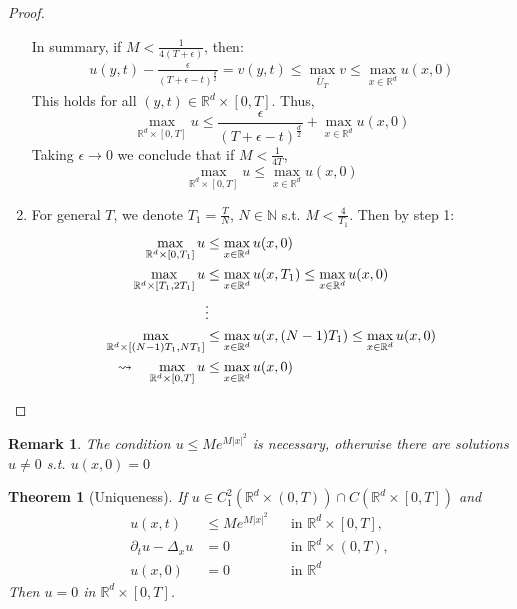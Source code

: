 \documentclass{report}
\theoremstyle{tommy}
\newtheorem{thm}[defn]{Theorem}
\newtheorem{rem}[defn]{Remark}
\begin{document}
\begin{proof}
\begin{enumerate}[label=Step \arabic*:]
		In summary, if \(M < \frac{1}{4(T+\epsilon)}\), then:
		\begin{align*}
		  u(y,t) - \frac{\epsilon}{(T+\epsilon-t)^{\frac{d}{2}}} = v(y,t) \le \max_{\bar U_T} v \le \max_{x \in \mathbb{R}^d} u(x,0)
		\end{align*}
		This holds for all \((y,t) \in \mathbb{R}^d \times [0,T]\). Thus,
		\[\max_{\mathbb{R}^d \times [0,T]} u \le \frac{\epsilon}{(T+\epsilon-t)^{\frac{d}{2}}} + \max_{x \in \mathbb{R}^d} u(x,0)\]
		Taking \(\epsilon \to 0\) we conclude that if \(M < \frac{1}{4T}\),
		\[\max_{\mathbb{R}^d \times [0,T]} u \le \max_{x \in \mathbb{R}^d} u(x,0)\]
		\item For general \(T\), we denote \(T_1 = \frac{T}{N}\), \(N \in \mathbb{N}\) s.t. \(M <\frac{4}{T_1}\). Then by step 1:
		\begin{align*}
			\max_{\mathbb{R}^d \times [0,T_1]} u &\le \max_{x \in \mathbb{R}^d} u(x,0) \\
			\max_{\mathbb{R}^d \times [T_1, 2 T_1]} u &\le \max_{x \in \mathbb{R}^d} u(x,T_1) \le \max_{x \in \mathbb{R}^d} u(x,0) \\
			&\vdots \\
			\max_{\mathbb{R}^d \times [(N-1) T_1, N T_1]} & \le \max_{x \in \mathbb{R}^d} u(x,(N-1) T_1) \le \max_{x \in \mathbb{R}^d} u(x,0) \\
			\leadsto \quad \max_{\mathbb{R}^d \times [0,T]} u &\le \max_{x \in \mathbb{R}^d} u(x,0) \qedhere
		\end{align*}
    \end{enumerate}
  \end{proof}

  \begin{rem}
    The condition \(u \le Me^{M|x|^2}\) is necessary, otherwise there are solutions \(u \ne 0\) s.t. \(u(x,0) = 0\)
  \end{rem}

  \begin{thm}[Uniqueness]
    If \(u \in C_1^2(\mathbb{R}^d \times (0,T)) \cap C(\mathbb{R}^d \times [0,T])\) and
    \begin{align*}
      u(x,t) &\le Me^{M|x|^2} &&\text{in } \mathbb{R}^d \times [0,T], \\
      \partial_t u - \Delta_x u &= 0 &&\text{in } \mathbb{R}^d \times (0,T), \\
      u(x,0) &= 0 &&\text{in } \mathbb{R}^d 
    \end{align*}
    Then \(u = 0\) in \(\mathbb{R}^d \times [0,T]\).
  \end{thm}
\end{document}
